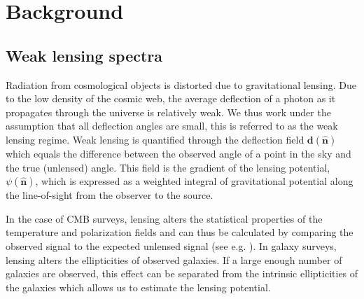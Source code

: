 \documentclass[11pt]{article} %
\begin{document}
%     

\section{Background}
\label{sec:theory}
\subsection{Weak lensing spectra}
Radiation from cosmological objects is distorted due to gravitational lensing. Due to the low density of the cosmic web, the average deflection of a photon as it propagates through the universe is relatively weak. We thus work under the assumption that all deflection angles are small, this is referred to as the weak lensing regime. Weak lensing is quantified through the deflection field $\mathbf d(\hat {\mathbf n})$ which equals the difference between the observed angle of a point in the sky and the true (unlensed) angle. This field is the gradient of the lensing potential, $\psi(\hat {\mathbf n})$, which is expressed as a weighted integral of gravitational potential along the line-of-sight from the observer to the source.

In the case of CMB surveys, lensing alters the statistical properties of the temperature and polarization fields and can thus be calculated by comparing the observed signal to the expected unlensed signal (see e.g. \cite{Maniyar2021_QE_CMBLensing, Hirata_2003}). In galaxy surveys, lensing alters the ellipticities of observed galaxies. If a large enough number of galaxies are observed, this effect can be separated from the intrinsic ellipticities of the galaxies which allows us to estimate the lensing potential.
\end{document}
